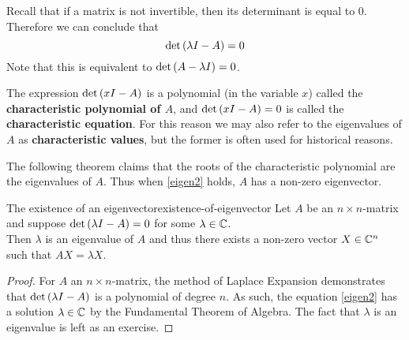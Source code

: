Recall that if a matrix
is not invertible, then its determinant is equal to $0$.  Therefore we
can conclude that
\begin{equation}
\det \left(\lambda I - A\right) =0  \label{eigen2}
\end{equation}
Note that this is equivalent to $\det \left(A- \lambda I \right) =0$. 

The expression $\det \left(x I-A\right) $ is a polynomial (in
the variable $x$) called the
\textbf{characteristic polynomial of $A$}, and 
$\det \left(x I-A\right) =0$ is called the \textbf{characteristic
equation}. For this reason we may also refer to
the eigenvalues of $A$ as \textbf{characteristic values}, but the
former is often used for historical reasons.

The following theorem claims that the roots of the characteristic
polynomial are the eigenvalues of $A$.  Thus when \ref{eigen2}
holds, $A$ has a non-zero eigenvector.

\begin{theorem}{The existence of an eigenvector}{existence-of-eigenvector}
Let $A$ be an $n\times n$-matrix and suppose $\det \left(\lambda I -
A\right) =0$ for some $ \lambda \in \mathbb{C}$.  \\
Then $\lambda$ is an eigenvalue of $A$ and thus there exists a non-zero
vector $X \in \mathbb{C}^{n}$ such that $AX=\lambda X$. 
\end{theorem}

\begin{proof}
For $A$ an $n\times n$-matrix, the method of Laplace
Expansion demonstrates that $\det \left(\lambda I - A \right) $ is a
polynomial of degree $n$. As such, the equation
\ref{eigen2} has a solution $\lambda \in \mathbb{C}$ by the Fundamental
Theorem of Algebra. The fact that $\lambda$ is an eigenvalue is left as an exercise. 
\end{proof}
